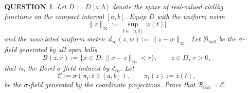 \documentclass[12pt]{article}
\renewcommand{\(}{\left(}%
\renewcommand{\)}{\right)}%
\renewcommand{\[}{\left[}%
\renewcommand{\]}{\right]}%
\newtheorem{question}{QUESTION}[section]}
\begin{document}
\begin{question}
Let $D:=D[a,b]$ denote the space of real-valued c\`adl\`ag functions on the compact interval $[a,b]$.
Equip $D$ with the uniform norm
\begin{equation*}
\|z\|_\infty := \sup_{t\in[a,b]} |z(t)|
\end{equation*}
and the associated uniform metric $d_\infty(z,w):=\|z-w\|_\infty$. Let $\mathcal B_{\mathrm{ball}}$ be the $\sigma$-field generated by all open balls
\begin{equation*}
B(z,r):=\{x\in D:\|x-z\|_\infty<r\}, \qquad z\in D,\ r>0,
\end{equation*}
that is, the Borel $\sigma$-field induced by $d_\infty$.
Let
\begin{equation*}
\mathcal C := \sigma(\pi_t:t\in[a,b]),
\qquad \pi_t(z):=z(t),
\end{equation*}
be the $\sigma$-field generated by the coordinate projections.
Prove that $\mathcal B_{\mathrm{ball}}=\mathcal C$.
\end{question}
\end{document}
